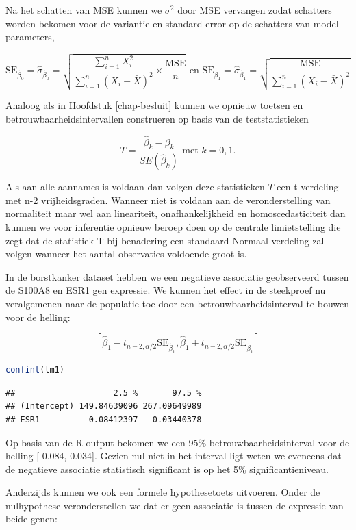 \documentclass[
  12pt,dutch,coursenotes]{book}
\begin{document}
Na het schatten van MSE kunnen we \(\sigma^2\) door MSE vervangen zodat schatters worden bekomen voor de variantie en standard error op de schatters van model parameters,

\[\text{SE}_{\hat{\beta}_0}=\hat\sigma_{\hat{\beta}_0}=\sqrt{\frac{\sum\limits_{i=1}^n X^2_i}{\sum\limits_{i=1}^n (X_i-\bar X)^2} \times\frac{\text{MSE}}{n}} \text{ en } \text{SE}_{\hat{\beta}_1}=\hat\sigma_{\hat{\beta}_1}=\sqrt{\frac{\text{MSE}}{\sum\limits_{i=1}^n (X_i-\bar X)^2}}\]

Analoog als in Hoofdstuk \ref{chap-besluit} kunnen we opnieuw toetsen en betrouwbaarheidsintervallen construeren op basis van de teststatistieken

\[T=\frac{\hat{\beta}_k-\beta_k}{SE(\hat{\beta}_k)} \text{ met } k=0,1.\]

Als aan alle aannames is voldaan dan volgen deze statistieken \(T\) een t-verdeling met n-2 vrijheidsgraden.
Wanneer niet is voldaan aan de veronderstelling van normaliteit maar wel aan lineariteit, onafhankelijkheid en homoscedasticiteit dan kunnen we voor inferentie opnieuw beroep doen op de centrale limietstelling die zegt dat de statistiek T bij benadering een standaard Normaal verdeling zal volgen wanneer het aantal observaties voldoende groot is.

In de borstkanker dataset hebben we een negatieve associatie geobserveerd tussen de S100A8 en ESR1 gen expressie.
We kunnen het effect in de steekproef nu veralgemenen naar de populatie toe door een betrouwbaarheidsinterval te bouwen voor de helling:

\[[\hat\beta_1 - t_{n-2,\alpha/2} \text{SE}_{\hat\beta_1},\hat\beta_1 + t_{n-2,\alpha/2} \text{SE}_{\hat\beta_1}]\]

\begin{lstlisting}[language=R]
confint(lm1)
\end{lstlisting}

\begin{lstlisting}
##                    2.5 %       97.5 %
## (Intercept) 149.84639096 267.09649989
## ESR1         -0.08412397  -0.03440378
\end{lstlisting}

Op basis van de R-output bekomen we een 95\% betrouwbaarheidsinterval voor de helling {[}-0.084,-0.034{]}.
Gezien nul niet in het interval ligt weten we eveneens dat de negatieve associatie statistisch significant is op het 5\% significantieniveau.

Anderzijds kunnen we ook een formele hypothesetoets uitvoeren. Onder de nulhypothese veronderstellen we dat er geen associatie is tussen de expressie van beide genen:
\end{document}
